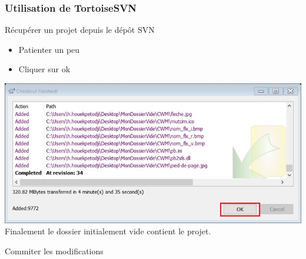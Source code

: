 \documentclass{beamer}
\begin{document}
\begin{frame}
\frametitle{Utilisation de TortoiseSVN}
\begin{block}{Récupérer un projet depuis le dépôt SVN }
\begin{itemize}
\item Patienter un peu
\item Cliquer sur ok
\end{itemize}
\end{block}
\includegraphics[scale=0.3]{../images/checkout3.jpg}
\newline
\newline
\newline
Finalement le dossier initialement vide contient le projet.
\end{frame}

\begin{frame}
\begin{center}
\huge{Commiter les modifications}
\end{center}
\end{frame}
\end{document}
